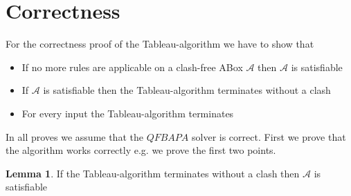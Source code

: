 \documentclass[a4paper,11pt]{scrartcl}
\theoremstyle{break}
\theoremstyle{definition}
\newtheorem{mylem}{Lemma}
\begin{document}
\section{Correctness}
For the correctness proof of the Tableau-algorithm we have to show that
\begin{itemize}
\item If no more rules are applicable on a clash-free ABox $\mathcal{A}$ then $\mathcal{A}$ is satisfiable
\item If $\mathcal{A}$ is satisfiable then the Tableau-algorithm terminates without a clash
\item For every input the Tableau-algorithm terminates
\end{itemize}
In all proves we assume that the $QFBAPA$ solver is correct. First we prove that the algorithm works correctly e.g. we prove the first two points. 
\begin{mylem}
If the Tableau-algorithm terminates without a clash then $\mathcal{A}$ is satisfiable
\end{mylem}
\end{document}
